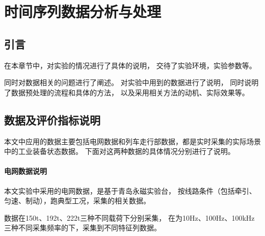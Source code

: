 

\chapter{时间序列数据分析与处理}\label{chapter3}


\section{引言}
  在本章节中，对实验的情况进行了具体的说明，
  交待了实验环境，实验参数等。

  同时对数据相关的问题进行了阐述。
  对实验中用到的数据进行了说明，
  同时说明了数据预处理的流程和具体的方法，
  以及采用相关方法的动机、实际效果等。


\section{数据及评价指标说明}
  本文中应用的数据主要包括电网数据和列车走行部数据，都是实时采集的实际场景中的工业装备状态数据。
  下面对这两种数据的具体情况分别进行了说明。

  \subsubsection{电网数据说明}
    本文实验中采用的电网数据，是基于青岛永磁实验台，
    按线路条件（包括牵引、匀速、制动），跑典型工况，采集的相关数据。

    数据在150t、192t、222t三种不同载荷下分别采集，
    在为10Hz、100Hz、100kHz三种不同采集频率的下，采集到不同特征列数据。

